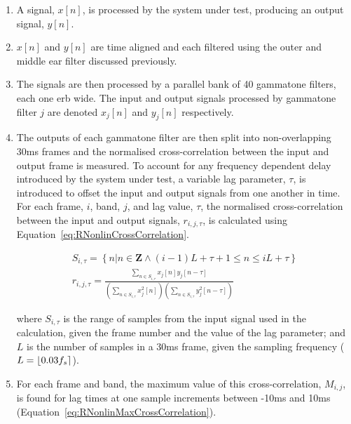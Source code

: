 			\begin{enumerate}
				\item A signal, $x[n]$, is processed by the system under test, producing an output signal,
					$y[n]$.

				\item $x[n]$ and $y[n]$ are time aligned and each filtered using the outer and middle ear
					filter discussed previously.

				\item The signals are then processed by a parallel bank of 40 gammatone filters, each one
					\acrshort{erb} wide. The input and output signals processed by gammatone filter $j$
					are denoted $x_j[n]$ and $y_j[n]$ respectively.

				\item The outputs of each gammatone filter are then split into non-overlapping 30ms frames
					and the normalised cross-correlation between the input and output frame is
					measured.  To account for any frequency dependent delay introduced by the system
					under test, a variable lag parameter, $\tau$, is introduced to offset the input and
					output signals from one another in time. For each frame, $i$, band, $j$, and lag
					value, $\tau$, the normalised cross-correlation between the input and output
					signals, $r_{i,j,\tau}$, is calculated using
					Equation~\ref{eq:RNonlinCrossCorrelation}.

					\begin{gather}
						S_{i,\tau} = \left\{ n | n \in \textbf{Z} 
							   \land (i-1)L+\tau+1 \leq n \leq iL + \tau \right\} 
							   \nonumber \\[0.6em]
						r_{i,j,\tau} = \frac{\sum_{n \in S_{i,\tau}} x_{j}[n]y_{j}[n-\tau]}
							{\left( \sum_{n \in S_{i,\tau}} x_{j}^{2}[n] \right) 
							\left( \sum_{n \in S_{i,\tau}} y_{j}^{2}[n-\tau] \right)}
						\label{eq:RNonlinCrossCorrelation}
					\end{gather}

					where $S_{i,\tau}$ is the range of samples from the input signal used in the
					calculation, given the frame number and the value of the lag parameter; and $L$ is
					the number of samples in a 30ms frame, given the sampling frequency ($L =
					\left\lfloor0.03f_{s}\right\rceil$). 

				\item For each frame and band, the maximum value of this cross-correlation, $M_{i,j}$, is
					found for lag times at one sample increments between -10ms and 10ms
					(Equation~\ref{eq:RNonlinMaxCrossCorrelation}).


\end{enumerate}

